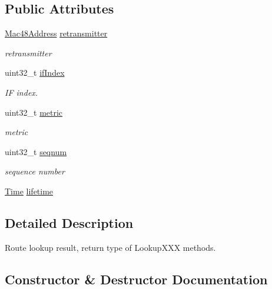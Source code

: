 \subsection*{Public Attributes}
\begin{DoxyCompactItemize}
\item 
\hyperlink{classns3_1_1Mac48Address}{Mac48\+Address} \hyperlink{structns3_1_1dot11s_1_1HwmpRtable_1_1LookupResult_ae18d2b84b512a78e57308e11ffab0a38}{retransmitter}
\begin{DoxyCompactList}\small\item\em retransmitter \end{DoxyCompactList}\item 
uint32\+\_\+t \hyperlink{structns3_1_1dot11s_1_1HwmpRtable_1_1LookupResult_ad7a9b09e35c7cb896523db562912c9ef}{if\+Index}
\begin{DoxyCompactList}\small\item\em IF index. \end{DoxyCompactList}\item 
uint32\+\_\+t \hyperlink{structns3_1_1dot11s_1_1HwmpRtable_1_1LookupResult_a4f284164803a0896f2dbafdd57fb777b}{metric}
\begin{DoxyCompactList}\small\item\em metric \end{DoxyCompactList}\item 
uint32\+\_\+t \hyperlink{structns3_1_1dot11s_1_1HwmpRtable_1_1LookupResult_a670dbb3a25df320b19e5792e3c2027e1}{seqnum}
\begin{DoxyCompactList}\small\item\em sequence number \end{DoxyCompactList}\item 
\hyperlink{classns3_1_1Time}{Time} \hyperlink{structns3_1_1dot11s_1_1HwmpRtable_1_1LookupResult_aad778ea58c7f2147815c0349cc677f29}{lifetime}
\end{DoxyCompactItemize}


\subsection{Detailed Description}
Route lookup result, return type of Lookup\+X\+XX methods. 

\subsection{Constructor \& Destructor Documentation}
